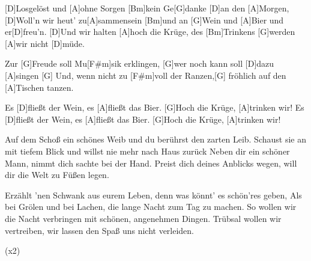 

\begin{guitar}
	[D]Losgelöst und [A]ohne Sorgen [Bm]kein Ge[G]danke [D]an den [A]Morgen,
	[D]Woll'n wir heut' zu[A]sammensein [Bm]und an [G]Wein und [A]Bier und er[D]freu'n.\vspace{0.1em}
	[D]Und wir halten [A]hoch die Krüge, des [Bm]Trinkens [G]werden [A]wir nicht [D]müde.
	
	Zur [G]Freude soll Mu[F#m]sik erklingen, [G]wer noch kann soll [D]dazu [A]singen
	[G] Und, wenn nicht zu [F#m]voll der Ranzen,[G] fröhlich auf den [A]Tischen tanzen.
	
	Es [D]fließt der Wein, es [A]fließt das Bier. [G]Hoch die Krüge, [A]trinken wir!
	Es [D]fließt der Wein, es [A]fließt das Bier. [G]Hoch die Krüge, [A]trinken wir!
	
	Auf dem Schoß ein schönes Weib und du berührst den zarten Leib.
	Schaust sie an mit tiefem Blick und willst nie mehr nach Haus zurück
	Neben dir ein schöner Mann, nimmt dich sachte bei der Hand.
	Preist dich deines Anblicks wegen, will dir die Welt zu Füßen legen.
	
	 
	
	 
	
	Erzählt 'nen Schwank aus eurem Leben, denn was könnt' es schön'res geben,
	Als bei Grölen und bei Lachen, die lange Nacht zum Tag zu machen.
	So wollen wir die Nacht verbringen mit schönen, angenehmen Dingen.
	Trübsal wollen wir vertreiben, wir lassen den Spaß uns nicht verleiden.
	
	 
	
	  (x2)
\end{guitar}





